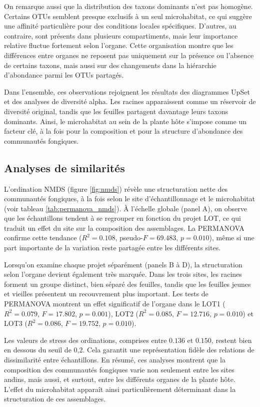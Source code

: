 \documentclass[alpha-refs,twocolumn]{wiley-article}
\begin{document}
On remarque aussi que la distribution des taxons dominants n’est pas homogène. Certains OTUs semblent presque exclusifs à un seul microhabitat, ce qui suggère une affinité particulière pour des conditions locales spécifiques. D’autres, au contraire, sont présents dans plusieurs compartiments, mais leur importance relative fluctue fortement selon l’organe. Cette organisation montre que les différences entre organes ne reposent pas uniquement sur la présence ou l’absence de certains taxons, mais aussi sur des changements dans la hiérarchie d’abondance parmi les OTUs partagés.

Dans l’ensemble, ces observations rejoignent les résultats des diagrammes UpSet et des analyses de diversité alpha. Les racines apparaissent comme un réservoir de diversité original, tandis que les feuilles partagent davantage leurs taxons dominants. Ainsi, le microhabitat au sein de la plante hôte s’impose comme un facteur clé, à la fois pour la composition et pour la structure d’abondance des communautés fongiques.

\subsection{Analyses de similarités}



L’ordination NMDS (figure \ref{fig:nmds}) révèle une structuration nette des communautés fongiques, à la fois selon le site d’échantillonnage et le microhabitat (voir tableau \ref{tab:permanova_nmds}). À l’échelle globale (panel A), on observe que les échantillons tendent à se regrouper en fonction du projet LOT, ce qui traduit un effet du site sur la composition des assemblages. La PERMANOVA confirme cette tendance (\(R^2 = 0.108\), pseudo-\(F = 69.483\), \(p = 0.010\)), même si une part importante de la variation reste partagée entre les différents sites.

Lorsqu’on examine chaque projet séparément (panels B à D), la structuration selon l’organe devient également très marquée. Dans les trois sites, les racines forment un groupe distinct, bien séparé des feuilles, tandis que les feuilles jeunes et vieilles présentent un recouvrement plus important. Les tests de PERMANOVA montrent un effet significatif de l’organe dans le LOT1 (\(R^2 = 0.079\), \(F = 17.802\), \(p = 0.001\)), LOT2 (\(R^2 = 0.085\), \(F = 12.716\), \(p = 0.010\)) et LOT3 (\(R^2 = 0.086\), \(F = 19.752\), \(p = 0.010\)).

Les valeurs de stress des ordinations, comprises entre \(0.136\) et \(0.150\), restent bien en dessous du seuil de 0{,}2. Cela garantit une représentation fidèle des relations de dissimilarité entre échantillons. En résumé, ces analyses montrent que la composition des communautés fongiques varie non seulement entre les sites andins, mais aussi, et surtout, entre les différents organes de la plante hôte. L’effet du microhabitat apparaît ainsi particulièrement déterminant dans la structuration de ces assemblages.
\end{document}
